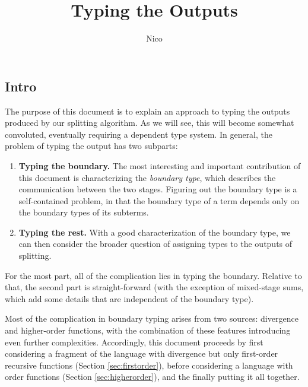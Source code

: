 \documentclass[]{article}
\title{Typing the Outputs}
\author{Nico}
\begin{document}
\maketitle

\begin{abstrsyn}

\newcommand {\colfunsym} {:>}
\newcommand {\colfun} [3] {{#1}\colfunsym{#2}~\myatsign~{#3}}

\newcommand {\ibksym} {\rotatebox[origin=c]{270}{$\therefore$}}
\newcommand {\btsym} {\rotatebox[origin=c]{270}{$\triangle$}}
\newcommand {\ktype} {\rm Type}
\newcommand {\ibk} [2] {{#1}~\ibksym~{#2}}
\newcommand {\btj} [4] {{#1}:{#2}~\myatsign~{#3}~\btsym~{#4}}
\newcommand {\btyo} [4] [\Gamma] {{#1}\vdash \btj{#2}{#3}\bbone{#4}}
\newcommand {\btyt} [4] [\Gamma] {{#1}\vdash \btj{#2}{#3}\bbtwo{#4}}
\newcommand {\btyw} [4] [\Gamma] {{#1}\vdash \btj{#2}{#3}w{#4}}
\newcommand {\btysub} [2] [] {\bty{e_{#1}:{#2}}{\tau_{#1}}{\sigma_{#1}}}

\section {Intro}

The purpose of this document is to explain an approach to typing the outputs produced by our splitting algorithm.
As we will see, this will become somewhat convoluted, eventually requiring a dependent type system.
In general, the problem of typing the output has two subparts:
\begin{enumerate}
\item \textbf{Typing the boundary.}  The most interesting and important contribution of this document is characterizing the 
\emph{boundary type}, which describes the communication between the two stages.  
Figuring out the boundary type is a self-contained problem, 
in that the boundary type of a term depends only on the boundary types of its subterms.

\item \textbf{Typing the rest.}  With a good characterization of the boundary type,
we can then consider the broader question of assigning types to the outputs of splitting.
\end{enumerate}

For the most part, all of the complication lies in typing the boundary.
Relative to that, the second part is straight-forward 
(with the exception of mixed-stage sums, which add some details that are independent of the boundary type).

Most of the complication in boundary typing arises from two sources: divergence and higher-order functions,
with the combination of these features introducing even further complexities.
Accordingly, this document proceeds by first considering a fragment of the language with
divergence but only first-order recursive functions (Section \ref{sec:firstorder}),
before considering a language with order functions (Section \ref{sec:higherorder}),
and the finally putting it all together.


\end{abstrsyn}
\end{document}
